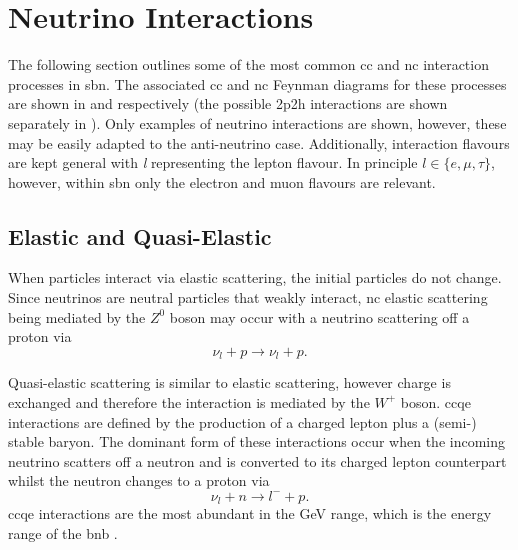 \section{Neutrino Interactions}\label{sec:neutrino_interactions}

The following section outlines some of the most common \gls{cc} and \gls{nc} interaction processes in \gls{sbn}. The associated \gls{cc} and \gls{nc} Feynman diagrams for these processes are shown in  and  respectively (the possible \gls{2p2h} interactions are shown separately in ). Only examples of neutrino interactions are shown, however, these may be easily adapted to the anti-neutrino case. Additionally, interaction flavours are kept general with \textit{l} representing the lepton flavour. In principle $l \in \{e, \mu, \tau\}$, however, within \gls{sbn} only the electron and muon flavours are relevant. 

\subsection*{Elastic and Quasi-Elastic}
When particles interact via elastic scattering, the initial particles do not change. Since neutrinos are neutral particles that weakly interact, \gls{nc} elastic scattering being mediated by the $Z^0$ boson may occur with a neutrino scattering off a proton via
\begin{equation}
    \nu_l + p \rightarrow \nu_l + p.
\end{equation}

Quasi-elastic scattering is similar to elastic scattering, however charge is exchanged and therefore the interaction is mediated by the $W^+$ boson. \gls{ccqe} interactions are defined by the production of a charged lepton plus a (semi-) stable baryon. The dominant form of these interactions occur when the incoming neutrino scatters off a neutron and is converted to its charged lepton counterpart whilst the neutron changes to a proton via
\begin{equation}
    \nu_l + n \rightarrow l^- + p.
\end{equation}
\gls{ccqe} interactions are the most abundant in the GeV range, which is the energy range of the \gls{bnb} \cite{Measurement_of_the_Antineutrino_Double-Differential_Charged-Current_Quasi-Elastic_Scattering_Cross_Section_at_MINERvA_book}. 

